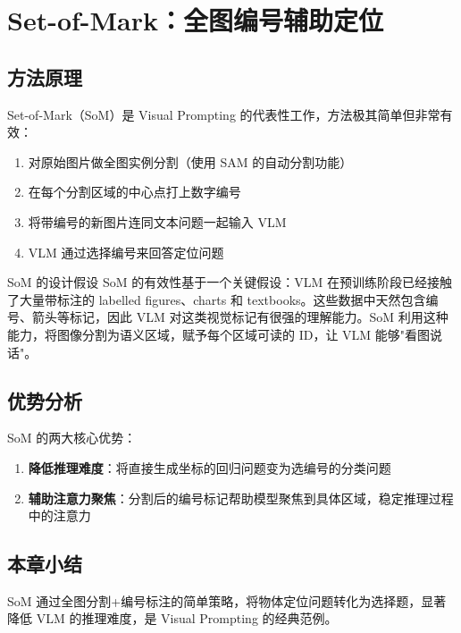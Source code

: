 \section{Set-of-Mark：全图编号辅助定位}

\subsection{方法原理}

Set-of-Mark（SoM）是 Visual Prompting 的代表性工作，方法极其简单但非常有效：

\begin{enumerate}
    \item 对原始图片做全图实例分割（使用 SAM 的自动分割功能）
    \item 在每个分割区域的中心点打上数字编号
    \item 将带编号的新图片连同文本问题一起输入 VLM
    \item VLM 通过选择编号来回答定位问题
\end{enumerate}

\begin{importantbox}{SoM 的设计假设}
SoM 的有效性基于一个关键假设：VLM 在预训练阶段已经接触了大量带标注的 labelled figures、charts 和 textbooks。这些数据中天然包含编号、箭头等标记，因此 VLM 对这类视觉标记有很强的理解能力。SoM 利用这种能力，将图像分割为语义区域，赋予每个区域可读的 ID，让 VLM 能够"看图说话"。
\end{importantbox}

\subsection{优势分析}

SoM 的两大核心优势：

\begin{enumerate}
    \item \textbf{降低推理难度}：将直接生成坐标的回归问题变为选编号的分类问题
    \item \textbf{辅助注意力聚焦}：分割后的编号标记帮助模型聚焦到具体区域，稳定推理过程中的注意力
\end{enumerate}

\subsection{本章小结}

SoM 通过全图分割+编号标注的简单策略，将物体定位问题转化为选择题，显著降低 VLM 的推理难度，是 Visual Prompting 的经典范例。


